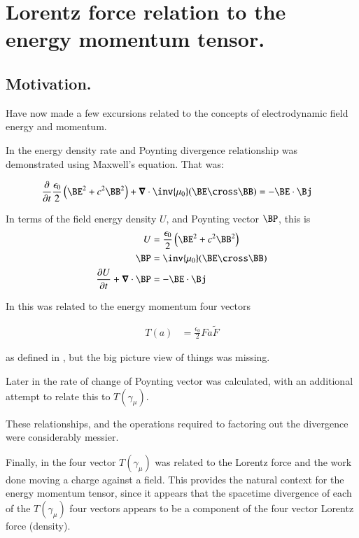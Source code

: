 \chapter{Lorentz force relation to the energy momentum tensor.}\label{chap:PJstressEnergyLorentz}
\date{Feb 13, 2009.  stressEnergyLorentz.tex}

\section{Motivation. }

Have now made a few excursions related to the concepts of electrodynamic
field energy and momentum.

In  the energy density rate and Poynting divergence 
relationship was demonstrated using Maxwell's equation.  That was:

\begin{align}
\PD{t}{}\frac{\epsilon_0}{2} \left(\BE^2 + c^2 \BB^2\right) + \spacegrad \cdot \inv{\mu_0}(\BE \cross \BB) &= -\BE \cdot \Bj 
\end{align}

In terms of the field energy density $U$, and Poynting vector $\BP$, this is
\begin{align}\label{eqn:seLorentz:energyDensityPoyntingDefined}
U &= \frac{\epsilon_0}{2} \left(\BE^2 + c^2 \BB^2\right) \\
\BP &= \inv{\mu_0}(\BE \cross \BB) \\
\PD{t}{U} + \spacegrad \cdot \BP &= -\BE \cdot \Bj 
\end{align}

In  this was related to the 
energy momentum four vectors

\begin{align}\label{eqn:seLorentz:lorentzForceT}
T(a) &= \frac{\epsilon_0}{2} F a \tilde{F}
\end{align}

as defined
in \cite{doran2003gap}, but the big picture view 
of things was missing.

Later in  the rate of change of Poynting vector
was calculated, with an additional attempt to relate this to $T(\gamma_\mu)$.

These relationships, and the operations required to factoring out the divergence were considerably messier.

Finally, in  the four vector $T(\gamma_\mu)$
was related to the Lorentz force and the work done moving a charge against
a field.  This provides the natural context for the energy momentum tensor, 
since it appears that the spacetime divergence of each of the
$T(\gamma_\mu)$ four vectors appears to be a component of the
four vector Lorentz force (density).  

